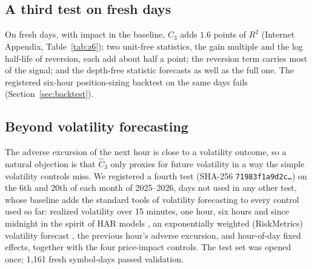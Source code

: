 \documentclass[12pt]{article}
\theoremstyle{definition}
\theoremstyle{remark}
\begin{document}
\subsection{A third test on fresh days}\label{sec:z6}
On fresh days, with impact in the baseline, $\hat C_3$ adds $1.6$ points of $R^2$ (Internet Appendix, Table~\ref{tab:z6}); two unit-free statistics, the gain multiple and the log half-life of reversion, each add about half a point; the reversion term carries most of the signal; and the depth-free statistic forecasts as well as the full one. The registered six-hour position-sizing backtest on the same days fails (Section~\ref{sec:backtest}).

\subsection{Beyond volatility forecasting}\label{sec:z9}
The adverse excursion of the next hour is close to a volatility outcome, so a natural objection is that $\hat C_3$ only proxies for future volatility in a way the simple volatility controls miss. We registered a fourth test (SHA-256 \texttt{71983f1a9d2c\ldots}) on the 6th and 20th of each month of 2025--2026, days not used in any other test, whose baseline adds the standard tools of volatility forecasting to every control used so far: realized volatility over 15 minutes, one hour, six hours and since midnight in the spirit of HAR models \citep{corsi2009}, an exponentially weighted (RiskMetrics) volatility forecast \citep{riskmetrics1996}, the previous hour's adverse excursion, and hour-of-day fixed effects, together with the four price-impact controls. The test set was opened once; 1{,}161 fresh symbol-days passed validation.
\end{document}
